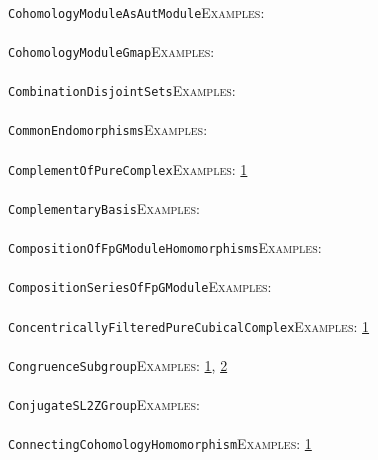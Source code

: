 \documentclass[a4paper,11pt]{report}
\begin{document}
{{ \\
 \texttt{CohomologyModule{\textunderscore}AsAutModule}{\nobreakspace}{\nobreakspace}{\nobreakspace}{\nobreakspace}\textsc{Examples:} \\
 \\
 \texttt{CohomologyModule{\textunderscore}Gmap}{\nobreakspace}{\nobreakspace}{\nobreakspace}{\nobreakspace}\textsc{Examples:} \\
 \\
 \texttt{CombinationDisjointSets}{\nobreakspace}{\nobreakspace}{\nobreakspace}{\nobreakspace}\textsc{Examples:} \\
 \\
 \texttt{CommonEndomorphisms}{\nobreakspace}{\nobreakspace}{\nobreakspace}{\nobreakspace}\textsc{Examples:} \\
 \\
 \texttt{ComplementOfPureComplex}{\nobreakspace}{\nobreakspace}{\nobreakspace}{\nobreakspace}\textsc{Examples:} \href{../www/SideLinks/About/aboutPeripheral.html} {1}{\nobreakspace} \\
 \\
 \texttt{ComplementaryBasis}{\nobreakspace}{\nobreakspace}{\nobreakspace}{\nobreakspace}\textsc{Examples:} \\
 \\
 \texttt{CompositionOfFpGModuleHomomorphisms}{\nobreakspace}{\nobreakspace}{\nobreakspace}{\nobreakspace}\textsc{Examples:} \\
 \\
 \texttt{CompositionSeriesOfFpGModule}{\nobreakspace}{\nobreakspace}{\nobreakspace}{\nobreakspace}\textsc{Examples:} \\
 \\
 \texttt{ConcentricallyFilteredPureCubicalComplex}{\nobreakspace}{\nobreakspace}{\nobreakspace}{\nobreakspace}\textsc{Examples:} \href{../www/SideLinks/About/aboutPersistent.html} {1}{\nobreakspace} \\
 \\
 \texttt{CongruenceSubgroup}{\nobreakspace}{\nobreakspace}{\nobreakspace}{\nobreakspace}\textsc{Examples:} \href{tutorial/chap10.html} {1}{\nobreakspace}, \href{../www/SideLinks/About/aboutArithmetic.html} {2}{\nobreakspace} \\
 \\
 \texttt{ConjugateSL2ZGroup}{\nobreakspace}{\nobreakspace}{\nobreakspace}{\nobreakspace}\textsc{Examples:} \\
 \\
 \texttt{ConnectingCohomologyHomomorphism}{\nobreakspace}{\nobreakspace}{\nobreakspace}{\nobreakspace}\textsc{Examples:} \href{../www/SideLinks/About/aboutCoefficientSequence.html} {1}{\nobreakspace} \\
}}
\end{document}
